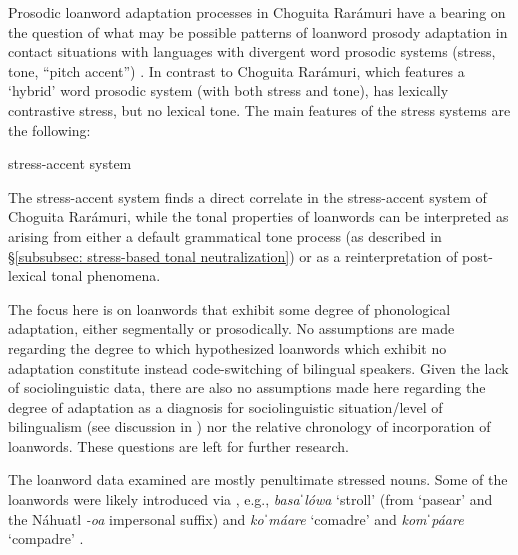 Prosodic loanword adaptation processes in Choguita Rarámuri have a bearing on the question of what may be possible patterns of loanword prosody adaptation in contact situations with languages with divergent word prosodic systems (stress, tone, “pitch accent”) \parencite{kubozono2006does, kuang2013tonal}. In contrast to Choguita Rarámuri, which features a `hybrid' word prosodic system (with both stress and tone),  has lexically contrastive stress, but no lexical tone. The main features of the  stress systems are the following:

\ea\label{ex: Spanish stress-accent system}
{ stress-accent system}
    \z
\z

The  stress-accent system finds a direct correlate in the stress-accent system of Choguita Rarámuri, while the tonal properties of loanwords can be interpreted as arising from either a default grammatical tone process (as described in §\ref{subsubsec: stress-based tonal neutralization}) or as a reinterpretation of  post-lexical tonal phenomena.

The focus here is on loanwords that exhibit some degree of phonological adaptation, either segmentally or prosodically. No assumptions are made regarding the degree to which hypothesized loanwords which exhibit no adaptation constitute instead code-switching of bilingual speakers. Given the lack of sociolinguistic data, there are also no assumptions made here regarding the degree of adaptation as a diagnosis for sociolinguistic situation/level of bilingualism (see discussion in \citealt{sicoli1999loanwords}) nor the relative chronology of incorporation of loanwords. These questions are left for further research.

The  loanword data examined are mostly penultimate stressed  nouns. Some of the loanwords were likely introduced via , e.g., \textit{basa}ˈ\textit{lówa} ‘stroll’ (from  `pasear’ and the Náhuatl \textit{{}-oa} impersonal suffix) and \textit{ko}ˈ\textit{máare} ‘comadre’ and \textit{kom}ˈ\textit{páare} ‘compadre’ \parencite{nordell1984spanish}.

